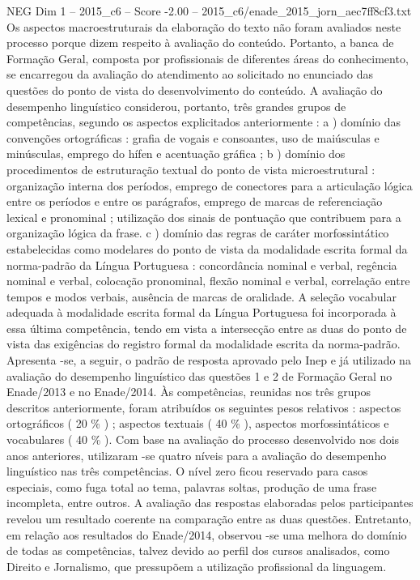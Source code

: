 \begin{textsample}{NEG Dim 1 – 2015\_c6 – Score -2.00 – 2015\_c6/enade\_2015\_jorn\_aec7ff8cf3.txt}
Os aspectos macroestruturais da elaboração do texto não foram avaliados neste processo porque dizem respeito à avaliação do conteúdo.
Portanto, a banca de Formação Geral, composta por profissionais de diferentes áreas do conhecimento, se encarregou da avaliação do atendimento ao solicitado no enunciado das questões do ponto de vista do desenvolvimento do conteúdo.
A avaliação do desempenho linguístico considerou, portanto, três grandes grupos de competências, segundo os aspectos explicitados anteriormente : a ) domínio das convenções ortográficas : grafia de vogais e consoantes, uso de maiúsculas e minúsculas, emprego do hífen e acentuação gráfica ; b ) domínio dos procedimentos de estruturação textual do ponto de vista microestrutural : organização interna dos períodos, emprego de conectores para a articulação lógica entre os períodos e entre os parágrafos, emprego de marcas de referenciação lexical e pronominal ; utilização dos sinais de pontuação que contribuem para a organização lógica da frase. c ) domínio das regras de caráter morfossintático estabelecidas como modelares do ponto de vista da modalidade escrita formal da norma-padrão da Língua Portuguesa : concordância nominal e verbal, regência nominal e verbal, colocação pronominal, flexão nominal e verbal, correlação entre tempos e modos verbais, ausência de marcas de oralidade.
A seleção vocabular adequada à modalidade escrita formal da Língua Portuguesa foi incorporada à essa última competência, tendo em vista a intersecção entre as duas do ponto de vista das exigências do registro formal da modalidade escrita da norma-padrão.
Apresenta -se, a seguir, o padrão de resposta aprovado pelo Inep e já utilizado na avaliação do desempenho linguístico das questões 1 e 2 de Formação Geral no Enade/2013 e no Enade/2014.
Às competências, reunidas nos três grupos descritos anteriormente, foram atribuídos os seguintes pesos relativos : aspectos ortográficos ( 20 \% ) ; aspectos textuais ( 40 \% ), aspectos morfossintáticos e vocabulares ( 40 \% ).
Com base na avaliação do processo desenvolvido nos dois anos anteriores, utilizaram -se quatro níveis para a avaliação do desempenho linguístico nas três competências.
O nível zero ficou reservado para casos especiais, como fuga total ao tema, palavras soltas, produção de uma frase incompleta, entre outros.
A avaliação das respostas elaboradas pelos participantes revelou um resultado coerente na comparação entre as duas questões.
Entretanto, em relação aos resultados do Enade/2014, observou -se uma melhora do domínio de todas as competências, talvez devido ao perfil dos cursos analisados, como Direito e Jornalismo, que pressupõem a utilização profissional da linguagem.

\end{textsample}
